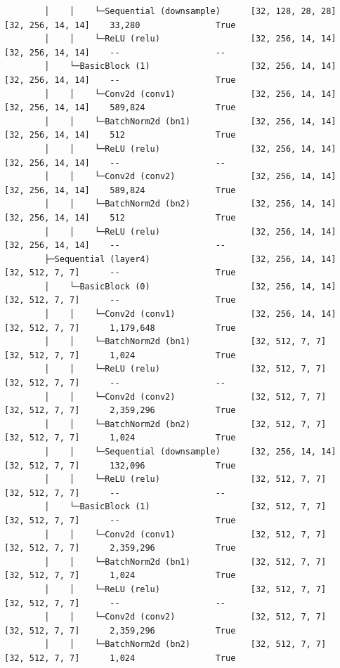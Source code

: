\documentclass{article}
\begin{document}
\begin{latin}
\begin{lstlisting}
		│    │    └─Sequential (downsample)      [32, 128, 28, 28]    [32, 256, 14, 14]    33,280               True
		│    │    └─ReLU (relu)                  [32, 256, 14, 14]    [32, 256, 14, 14]    --                   --
		│    └─BasicBlock (1)                    [32, 256, 14, 14]    [32, 256, 14, 14]    --                   True
		│    │    └─Conv2d (conv1)               [32, 256, 14, 14]    [32, 256, 14, 14]    589,824              True
		│    │    └─BatchNorm2d (bn1)            [32, 256, 14, 14]    [32, 256, 14, 14]    512                  True
		│    │    └─ReLU (relu)                  [32, 256, 14, 14]    [32, 256, 14, 14]    --                   --
		│    │    └─Conv2d (conv2)               [32, 256, 14, 14]    [32, 256, 14, 14]    589,824              True
		│    │    └─BatchNorm2d (bn2)            [32, 256, 14, 14]    [32, 256, 14, 14]    512                  True
		│    │    └─ReLU (relu)                  [32, 256, 14, 14]    [32, 256, 14, 14]    --                   --
		├─Sequential (layer4)                    [32, 256, 14, 14]    [32, 512, 7, 7]      --                   True
		│    └─BasicBlock (0)                    [32, 256, 14, 14]    [32, 512, 7, 7]      --                   True
		│    │    └─Conv2d (conv1)               [32, 256, 14, 14]    [32, 512, 7, 7]      1,179,648            True
		│    │    └─BatchNorm2d (bn1)            [32, 512, 7, 7]      [32, 512, 7, 7]      1,024                True
		│    │    └─ReLU (relu)                  [32, 512, 7, 7]      [32, 512, 7, 7]      --                   --
		│    │    └─Conv2d (conv2)               [32, 512, 7, 7]      [32, 512, 7, 7]      2,359,296            True
		│    │    └─BatchNorm2d (bn2)            [32, 512, 7, 7]      [32, 512, 7, 7]      1,024                True
		│    │    └─Sequential (downsample)      [32, 256, 14, 14]    [32, 512, 7, 7]      132,096              True
		│    │    └─ReLU (relu)                  [32, 512, 7, 7]      [32, 512, 7, 7]      --                   --
		│    └─BasicBlock (1)                    [32, 512, 7, 7]      [32, 512, 7, 7]      --                   True
		│    │    └─Conv2d (conv1)               [32, 512, 7, 7]      [32, 512, 7, 7]      2,359,296            True
		│    │    └─BatchNorm2d (bn1)            [32, 512, 7, 7]      [32, 512, 7, 7]      1,024                True
		│    │    └─ReLU (relu)                  [32, 512, 7, 7]      [32, 512, 7, 7]      --                   --
		│    │    └─Conv2d (conv2)               [32, 512, 7, 7]      [32, 512, 7, 7]      2,359,296            True
		│    │    └─BatchNorm2d (bn2)            [32, 512, 7, 7]      [32, 512, 7, 7]      1,024                True

\end{lstlisting}
\end{latin}
\end{document}

